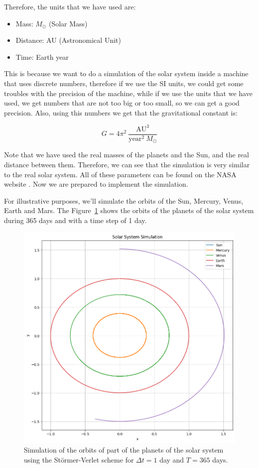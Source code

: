 \documentclass{article}
\begin{document}
Therefore, the units that we have used are:

\begin{itemize}
	\item Mass: \(M_{\odot}\) (Solar Mass)
	\item Distance: AU (Astronomical Unit)
	\item Time: Earth year
\end{itemize}

This is because we want to do a simulation of the solar system inside a machine that uses discrete numbers, therefore if we use the SI units, we could get some troubles with the precision of the machine, while if we use the units that we have used, we get numbers that are not too big or too small, so we can get a good precision. Also, using this numbers we get that the gravitational constant is:

\[
	G = 4 \pi^2 \ \frac{\text{AU}^3}{\text{year}^2 \ M_{\odot}}
\]

Note that we have used the real masses of the planets and the Sun, and the real distance between them. Therefore, we can see that the simulation is very similar to the real solar system. All of these parameters can be found on the NASA website \cite{nssdc2022planetaryfactsheet}. Now we are prepared to implement the simulation. 

For illustrative purposes, we'll simulate the orbits of the Sun, Mercury, Venus, Earth and Mars. The Figure~\ref{fig:solarsystem} shows the orbits of the planets of the solar system during 365 days and with a time step of 1 day.

\begin{figure}[H]
	\centering
	\includegraphics[width=0.5\linewidth]{./Figures/SolarSystem/orbits.png}
	\caption{Simulation of the orbits of part of the planets of the solar system using the Störmer-Verlet scheme for \(\Delta t = 1\) day and \(T = 365\) days.}
	\label{fig:solarsystem}
\end{figure}
\end{document}
